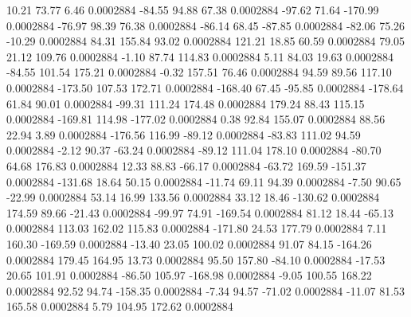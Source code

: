        10.21       73.77        6.46     0.0002884
      -84.55       94.88       67.38     0.0002884
      -97.62       71.64     -170.99     0.0002884
      -76.97       98.39       76.38     0.0002884
      -86.14       68.45      -87.85     0.0002884
      -82.06       75.26      -10.29     0.0002884
       84.31      155.84       93.02     0.0002884
      121.21       18.85       60.59     0.0002884
       79.05       21.12      109.76     0.0002884
       -1.10       87.74      114.83     0.0002884
        5.11       84.03       19.63     0.0002884
      -84.55      101.54      175.21     0.0002884
       -0.32      157.51       76.46     0.0002884
       94.59       89.56      117.10     0.0002884
     -173.50      107.53      172.71     0.0002884
     -168.40       67.45      -95.85     0.0002884
     -178.64       61.84       90.01     0.0002884
      -99.31      111.24      174.48     0.0002884
      179.24       88.43      115.15     0.0002884
     -169.81      114.98     -177.02     0.0002884
        0.38       92.84      155.07     0.0002884
       88.56       22.94        3.89     0.0002884
     -176.56      116.99      -89.12     0.0002884
      -83.83      111.02       94.59     0.0002884
       -2.12       90.37      -63.24     0.0002884
      -89.12      111.04      178.10     0.0002884
      -80.70       64.68      176.83     0.0002884
       12.33       88.83      -66.17     0.0002884
      -63.72      169.59     -151.37     0.0002884
     -131.68       18.64       50.15     0.0002884
      -11.74       69.11       94.39     0.0002884
       -7.50       90.65      -22.99     0.0002884
       53.14       16.99      133.56     0.0002884
       33.12       18.46     -130.62     0.0002884
      174.59       89.66      -21.43     0.0002884
      -99.97       74.91     -169.54     0.0002884
       81.12       18.44      -65.13     0.0002884
      113.03      162.02      115.83     0.0002884
     -171.80       24.53      177.79     0.0002884
        7.11      160.30     -169.59     0.0002884
      -13.40       23.05      100.02     0.0002884
       91.07       84.15     -164.26     0.0002884
      179.45      164.95       13.73     0.0002884
       95.50      157.80      -84.10     0.0002884
      -17.53       20.65      101.91     0.0002884
      -86.50      105.97     -168.98     0.0002884
       -9.05      100.55      168.22     0.0002884
       92.52       94.74     -158.35     0.0002884
       -7.34       94.57      -71.02     0.0002884
      -11.07       81.53      165.58     0.0002884
        5.79      104.95      172.62     0.0002884
